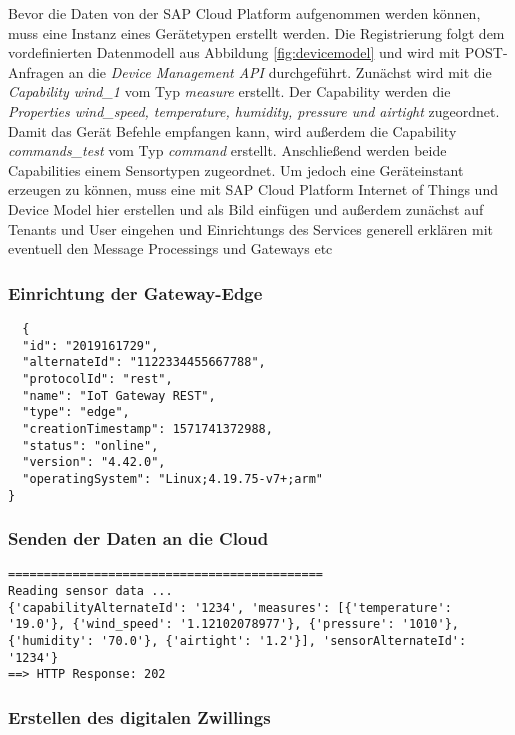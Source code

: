 Bevor die Daten von der SAP Cloud Platform aufgenommen werden können, muss eine Instanz eines Gerätetypen erstellt werden. Die Registrierung folgt dem vordefinierten Datenmodell aus Abbildung \ref{fig:devicemodel} und wird mit POST-Anfragen an die \textit{Device Management API} durchgeführt. Zunächst wird mit die \textit{Capability wind\_1} vom Typ \textit{measure} erstellt. Der Capability werden die \textit{Properties wind\_speed, temperature, humidity, pressure und airtight} zugeordnet. Damit das Gerät Befehle empfangen kann, wird außerdem die Capability \textit{commands\_test} vom Typ \textit{command} erstellt. Anschließend werden beide Capabilities einem Sensortypen zugeordnet. Um jedoch eine Geräteinstant erzeugen zu können, muss eine
mit SAP Cloud Platform Internet of Things und Device Model hier erstellen und als Bild einfügen und außerdem zunächst auf Tenants und User eingehen und Einrichtungs des Services generell erklären mit eventuell den Message Processings
und Gateways etc
\subsubsection{Einrichtung der Gateway-Edge}

\begin{lstlisting}
  {
  "id": "2019161729",
  "alternateId": "1122334455667788",
  "protocolId": "rest",
  "name": "IoT Gateway REST",
  "type": "edge",
  "creationTimestamp": 1571741372988,
  "status": "online",
  "version": "4.42.0",
  "operatingSystem": "Linux;4.19.75-v7+;arm"
}

\end{lstlisting}


\subsubsection{Senden der Daten an die Cloud}

\begin{lstlisting}
============================================
Reading sensor data ...
{'capabilityAlternateId': '1234', 'measures': [{'temperature': '19.0'}, {'wind_speed': '1.12102078977'}, {'pressure': '1010'}, {'humidity': '70.0'}, {'airtight': '1.2'}], 'sensorAlternateId': '1234'}
==> HTTP Response: 202
\end{lstlisting}

\subsubsection{Erstellen des digitalen Zwillings}

